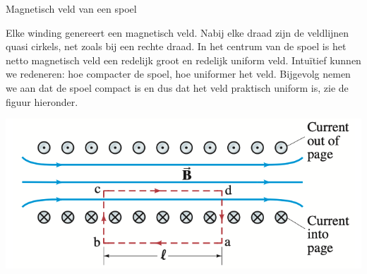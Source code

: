 \begin{app}{Magnetisch veld van een spoel}


    \noindent Elke winding genereert een magnetisch veld. Nabij elke draad zijn de veldlijnen quasi cirkels, net zoals bij een rechte draad. 
    In het centrum van de spoel is het netto magnetisch veld een redelijk groot en redelijk uniform veld. Intuïtief kunnen we redeneren: hoe compacter de spoel, hoe uniformer het veld. 
    Bijgevolg nemen we aan dat de spoel compact is en dus dat het veld praktisch uniform is, zie de figuur hieronder.

    \begin{center}
        \hspace*{1cm}\includegraphics[scale = 0.3]{Images/Magnetisme/SpoelMagnetischVeld}
    \end{center}


\end{app}
